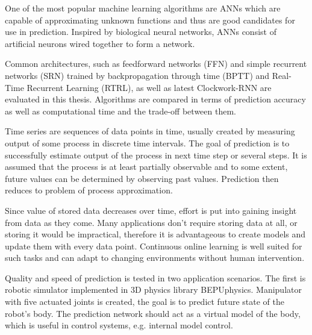 \documentclass[12pt,oneside]{fithesis2}
\begin{document}
\par %
One of the most popular machine learning algorithms are ANNs which are capable of approximating unknown functions and thus are good candidates for use in prediction. Inspired by biological neural networks, ANNs consist of artificial neurons wired together to form a network.
\par %
Common architectures, such as feedforward networks (FFN) and simple recurrent networks (SRN) trained by backpropagation through time (BPTT) and Real-Time Recurrent Learning (RTRL), as well as latest Clockwork-RNN are evaluated in this thesis. Algorithms are compared in terms of prediction accuracy as well as computational time and the trade-off between them.
\par %
Time series are sequences of data points in time, usually created by measuring output of some process in discrete time intervals. The goal of prediction is to successfully estimate output of the process in next time step or several steps. It is assumed that the process is at least partially observable and to some extent, future values can be determined by observing past values. Prediction then reduces to problem of process approximation.
\par %
Since value of stored data decreases over time, effort is put into gaining insight from data as they come. Many applications don't require storing data at all, or storing it would be impractical, therefore it is advantageous to create models and update them with every data point. Continuous online learning is well suited for such tasks and can adapt to changing environments without human intervention.
\par %
Quality and speed of prediction is tested in two application scenarios. The first is robotic simulator implemented in 3D physics library BEPUphysics. Manipulator with five actuated joints is created, the goal is to predict future state of the robot's body. The prediction network should act as a virtual model of the body, which is useful in control systems, e.g. internal model control.

\end{document}
